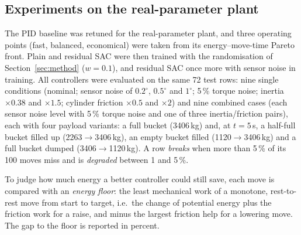 \subsection{Experiments on the real-parameter plant}
The PID baseline was retuned for the real-parameter plant, and three operating points
(fast, balanced, economical) were taken from its energy--move-time Pareto front.
Plain and residual SAC were then trained with the randomisation of Section~\ref{sec:method}
($w=0.1$), and residual SAC once more with sensor noise in training.
All controllers were evaluated on the same 72 test rows: nine single conditions
(nominal; sensor noise of $0.2^\circ$, $0.5^\circ$ and $1^\circ$; 5\,\% torque noise;
inertia $\times0.38$ and $\times1.5$; cylinder friction $\times0.5$ and $\times2$)
and nine combined cases (each sensor noise level with 5\,\% torque noise and one of three
inertia/friction pairs), each with four payload variants: a full bucket (3406\,kg) and,
at $t=5$\,s, a half-full bucket filled up (2263$\to$3406\,kg), an empty bucket filled
(1120$\to$3406\,kg) and a full bucket dumped (3406$\to$1120\,kg).
A row \emph{breaks} when more than 5\,\% of its 100 moves miss and is \emph{degraded}
between 1 and 5\,\%.

To judge how much energy a better controller could still save, each move is compared with an
\emph{energy floor}: the least mechanical work of a monotone, rest-to-rest move from start to
target, i.e.\ the change of potential energy plus the friction work for a raise, and minus the
largest friction help for a lowering move. The gap to the floor is reported in percent.
